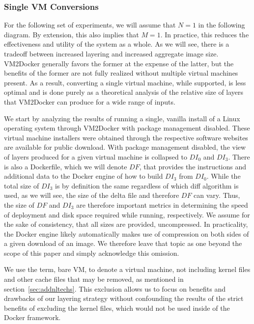 \subsubsection{Single VM Conversions}
For the following set of experiments, we will assume that $N=1$ in the following diagram. By extension, this also implies that $M=1$. In practice, this reduces the effectiveness and utility of the system as a whole. As we will see, there is a tradeoff between increased layering and increased aggregate image size. VM2Docker generally favors the former at the expense of the latter, but the benefits of the former are not fully realized without multiple virtual machines present. As a result, converting a single virtual machine, while supported, is less optimal and is done purely as a theoretical analysis of the relative size of layers that VM2Docker can produce for a wide range of inputs.

We start by analyzing the results of running a single, vanilla install of a Linux operating system through VM2Docker with package management disabled. These virtual machine installers were obtained through the respective software websites are available for public download. With package management disabled, the view of layers produced for a given virtual machine is collapsed to $DI_0$ and $DI_3$. There is also a Dockerfile, which we will denote $DF$, that provides the instructions and additional data to the Docker engine of how to build $DI_3$ from $DI_0$. While the total size of $DI_3$ is by definition the same regardless of which diff algorithm is used, as we will see, the size of the delta file and therefore $DF$ can vary. Thus, the size of $DF$ and $DI_3$ are therefore important metrics in determining the speed of deployment and disk space required while running, respectively. We assume for the sake of consistency, that all sizes are provided, uncompressed. In practicality, the Docker engine likely automatically makes use of compression on both sides of a given download of an image. We therefore leave that topic as one beyond the scope of this paper and simply acknowledge this omission.

We use the term, bare VM, to denote a virtual machine, not including kernel files and other cache files that may be removed, as mentioned in section~\ref{sec:addnltechs}. This exclusion allows us to focus on benefits and drawbacks of our layering strategy without confounding the results of the strict benefits of excluding the kernel files, which would not be used inside of the Docker framework.

